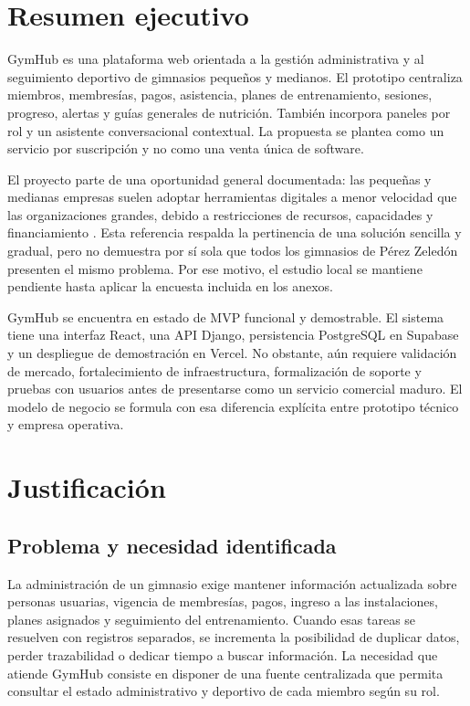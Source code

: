 \section{Resumen ejecutivo}

GymHub es una plataforma web orientada a la gestión administrativa y al
seguimiento deportivo de gimnasios pequeños y medianos. El prototipo centraliza
miembros, membresías, pagos, asistencia, planes de entrenamiento, sesiones,
progreso, alertas y guías generales de nutrición. También incorpora paneles por
rol y un asistente conversacional contextual. La propuesta se plantea como un
servicio por suscripción y no como una venta única de software.

El proyecto parte de una oportunidad general documentada: las pequeñas y
medianas empresas suelen adoptar herramientas digitales a menor velocidad que
las organizaciones grandes, debido a restricciones de recursos, capacidades y
financiamiento \parencite{oecd2021}. Esta referencia respalda la pertinencia de
una solución sencilla y gradual, pero no demuestra por sí sola que todos los
gimnasios de Pérez Zeledón presenten el mismo problema. Por ese motivo, el
estudio local se mantiene pendiente hasta aplicar la encuesta incluida en los
anexos.

GymHub se encuentra en estado de MVP funcional y demostrable. El sistema tiene
una interfaz React, una API Django, persistencia PostgreSQL en Supabase y un
despliegue de demostración en Vercel. No obstante, aún requiere validación de
mercado, fortalecimiento de infraestructura, formalización de soporte y pruebas
con usuarios antes de presentarse como un servicio comercial maduro. El modelo
de negocio se formula con esa diferencia explícita entre prototipo técnico y
empresa operativa.

\section{Justificación}

\subsection{Problema y necesidad identificada}

La administración de un gimnasio exige mantener información actualizada sobre
personas usuarias, vigencia de membresías, pagos, ingreso a las instalaciones,
planes asignados y seguimiento del entrenamiento. Cuando esas tareas se
resuelven con registros separados, se incrementa la posibilidad de duplicar
datos, perder trazabilidad o dedicar tiempo a buscar información. La necesidad
que atiende GymHub consiste en disponer de una fuente centralizada que permita
consultar el estado administrativo y deportivo de cada miembro según su rol.

